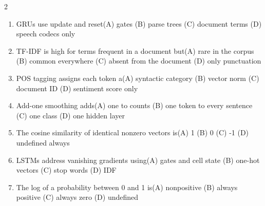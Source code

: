 \documentclass[a4paper]{article}
\begin{document}
\begin{multicols*}{2}
\begin{enumerate}[resume]
\item GRUs use update and reset\newline\hspace*{0.6em}(A) gates \quad (B) parse trees \newline\hspace*{0.6em}(C) document terms \quad (D) speech codecs only
\item TF-IDF is high for terms frequent in a document but\newline\hspace*{0.6em}(A) rare in the corpus \quad (B) common everywhere \newline\hspace*{0.6em}(C) absent from the document \quad (D) only punctuation
\item POS tagging assigns each token a\newline\hspace*{0.6em}(A) syntactic category \quad (B) vector norm \newline\hspace*{0.6em}(C) document ID \quad (D) sentiment score only
\item Add-one smoothing adds\newline\hspace*{0.6em}(A) one to counts \quad (B) one token to every sentence \newline\hspace*{0.6em}(C) one class \quad (D) one hidden layer
\item The cosine similarity of identical nonzero vectors is\newline\hspace*{0.6em}(A) 1 \quad (B) 0 \newline\hspace*{0.6em}(C) -1 \quad (D) undefined always
\item LSTMs address vanishing gradients using\newline\hspace*{0.6em}(A) gates and cell state \quad (B) one-hot vectors \newline\hspace*{0.6em}(C) stop words \quad (D) IDF
\item The log of a probability between 0 and 1 is\newline\hspace*{0.6em}(A) nonpositive \quad (B) always positive \newline\hspace*{0.6em}(C) always zero \quad (D) undefined

\end{enumerate}
\end{multicols*}
\end{document}
